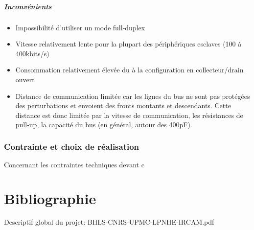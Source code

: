 \documentclass[french,a4paper,12pt]{report}
\begin{document}
  \subsubsection{Inconvénients}
\begin{itemize}
\item Impossibilité d’utiliser un mode full-duplex

\item Vitesse relativement lente pour la plupart des périphériques esclaves (100 à 400kbits/s)

\item Consommation relativement élevée du à la configuration en collecteur/drain ouvert

\item Distance de communication limitée car les lignes du bus ne sont pas protégées des perturbations et envoient des fronts montants et descendants. Cette distance est donc limitée par la vitesse de communication, les résistances de pull-up, la capacité du bus (en général, autour des 400pF).
\end{itemize}

 \section{Contrainte et choix de réalisation}
Concernant les contraintes techniques devant c


\part{Bibliographie}

Descriptif global du projet:
BHLS-CNRS-UPMC-LPNHE-IRCAM.pdf
\end{document}
